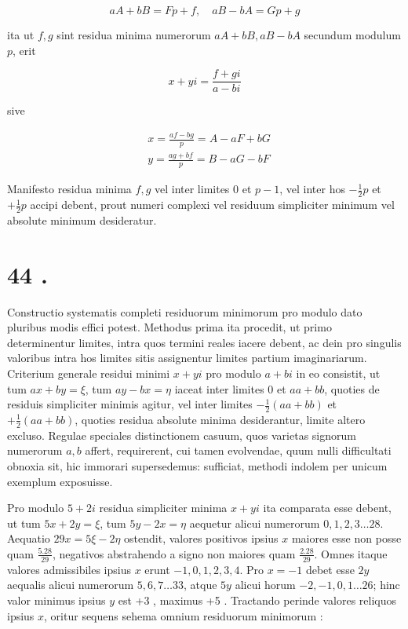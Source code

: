 \documentclass[10pt]{article}
\begin{document}
\[
a A+b B=F p+f, \quad a B-b A=G p+g
\]

ita ut \(f, g\) sint residua minima numerorum \(a A+b B, a B-b A\) secundum modulum \(p\), erit

\[
x+y i=\frac{f+g i}{a-b i}
\]

sive

\[
\begin{aligned}
& x=\frac{a f-b g}{p}=A-a F+b G \\
& y=\frac{a g+b f}{p}=B-a G-b F
\end{aligned}
\]

Manifesto residua minima \(f, g\) vel inter limites 0 et \(p-1\), vel inter hos \(-\frac{1}{2} p\) et \(+\frac{1}{2} p\) accipi debent, prout numeri complexi vel residuum simpliciter minimum vel absolute minimum desideratur.

\section*{44 .}
Constructio systematis completi residuorum minimorum pro modulo dato pluribus modis effici potest. Methodus prima ita procedit, ut primo determinentur limites, intra quos termini reales iacere debent, ac dein pro singulis valoribus intra hos limites sitis assignentur limites partium imaginariarum. Criterium generale residui minimi \(x+y i\) pro modulo \(a+b i\) in eo consistit, ut tum \(a x+b y=\xi\), tum \(a y-b x=\eta\) iaceat inter limites 0 et \(a a+b b\), quoties de residuis simpliciter minimis agitur, vel inter limites \(-\frac{1}{2}(a a+b b)\) et \(+\frac{1}{2}(a a+b b)\), quoties residua absolute minima desiderantur, limite altero excluso. Regulae speciales distinctionem casuum, quos varietas signorum numerorum \(a, b\) affert, requirerent, cui tamen evolvendae, quum nulli difficultati obnoxia sit, hic immorari supersedemus: sufficiat, methodi indolem per unicum exemplum exposuisse.

Pro modulo \(5+2 i\) residua simpliciter minima \(x+y i\) ita comparata esse debent, ut tum \(5 x+2 y=\xi\), tum \(5 y-2 x=\eta\) aequetur alicui numerorum \(0,1,2,3 \ldots 28\). Aequatio \(29 x=5 \xi-2 \eta\) ostendit, valores positivos ipsius \(x\) maiores esse non posse quam \(\frac{5.28}{29}\), negativos abstrahendo a signo non maiores quam \(\frac{2.28}{29}\). Omnes itaque valores admissibiles ipsius \(x\) erunt \(-1,0,1,2,3,4\). Pro \(x=-1\) debet esse \(2 y\) aequalis alicui numerorum \(5,6,7 \ldots 33\), atque \(5 y\) alicui horum \(-2,-1,0,1 \ldots 26\); hinc valor minimus ipsius \(y\) est +3 , maximus +5 . Tractando perinde valores reliquos ipsius \(x\), oritur sequens sehema omnium residuorum minimorum :
\end{document}
